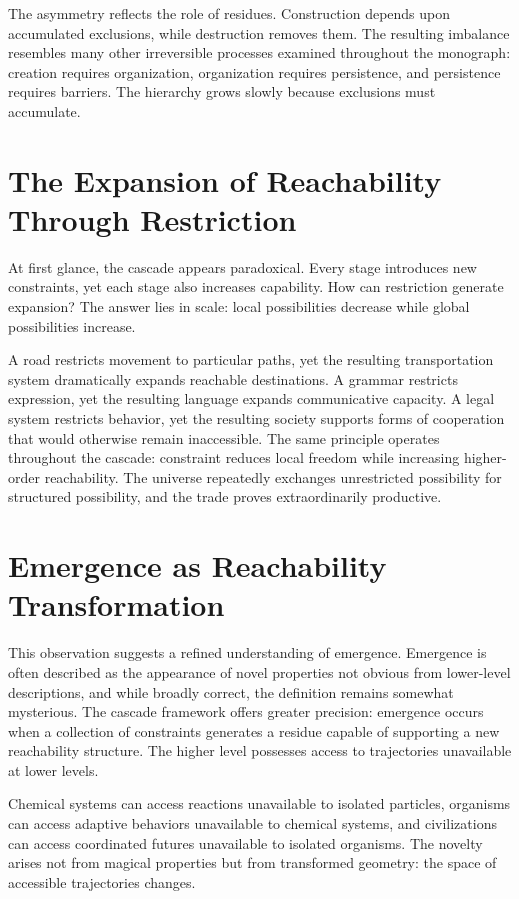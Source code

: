 \documentclass[11pt,oneside]{book}
\theoremstyle{plain}
\theoremstyle{definition}
\theoremstyle{remark}
\begin{document}
The asymmetry reflects the role of residues. Construction depends upon accumulated exclusions, while destruction removes them. The resulting imbalance resembles many other irreversible processes examined throughout the monograph: creation requires organization, organization requires persistence, and persistence requires barriers. The hierarchy grows slowly because exclusions must accumulate.

\section{The Expansion of Reachability Through Restriction}

At first glance, the cascade appears paradoxical. Every stage introduces new constraints, yet each stage also increases capability. How can restriction generate expansion? The answer lies in scale: local possibilities decrease while global possibilities increase.

A road restricts movement to particular paths, yet the resulting transportation system dramatically expands reachable destinations. A grammar restricts expression, yet the resulting language expands communicative capacity. A legal system restricts behavior, yet the resulting society supports forms of cooperation that would otherwise remain inaccessible. The same principle operates throughout the cascade: constraint reduces local freedom while increasing higher-order reachability. The universe repeatedly exchanges unrestricted possibility for structured possibility, and the trade proves extraordinarily productive.

\section{Emergence as Reachability Transformation}

This observation suggests a refined understanding of emergence. Emergence is often described as the appearance of novel properties not obvious from lower-level descriptions, and while broadly correct, the definition remains somewhat mysterious. The cascade framework offers greater precision: emergence occurs when a collection of constraints generates a residue capable of supporting a new reachability structure. The higher level possesses access to trajectories unavailable at lower levels.

Chemical systems can access reactions unavailable to isolated particles, organisms can access adaptive behaviors unavailable to chemical systems, and civilizations can access coordinated futures unavailable to isolated organisms. The novelty arises not from magical properties but from transformed geometry: the space of accessible trajectories changes.
\end{document}
